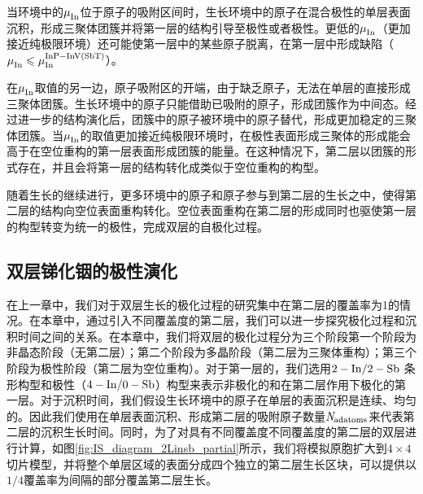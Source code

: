 当环境中的$\it \mu_{\rm In}^{\rm } \it$位于原子的吸附区间时，生长环境中的原子在混合极性的单层表面沉积，形成三聚体团簇并将第一层的结构引导至极性或者极性。更低的$\it \mu_{\rm In}^{\rm } \it$（更加接近纯极限环境）还可能使第一层中的某些原子脱离，在第一层中形成缺陷（$\it \mu_{\rm In}^{\rm } \it\leqslant \it \mu_{\rm In}^{\rm InP-InV\left(SbT\right)} \it$）。

在$\it \mu_{\rm In}^{\rm } \it$取值的另一边，原子吸附区的开端，由于缺乏原子，无法在单层的直接形成三聚体团簇。生长环境中的原子只能借助已吸附的原子，形成团簇作为中间态。经过进一步的结构演化后，团簇中的原子被环境中的原子替代，形成更加稳定的三聚体团簇。当$\it \mu_{\rm In}^{\rm } \it$的取值更加接近纯极限环境时，在极性表面形成三聚体的形成能会高于在空位重构的第一层表面形成团簇的能量。在这种情况下，第二层以团簇的形式存在，并且会将第一层的结构转化成类似于空位重构的构型。

随着生长的继续进行，更多环境中的原子和原子参与到第二层的生长之中，使得第二层的结构向空位表面重构转化。空位表面重构在第二层的形成同时也驱使第一层的构型转变为统一的极性，完成双层的自极化过程。



\subsection{双层锑化铟的极性演化}

在上一章中，我们对于双层生长的极化过程的研究集中在第二层的覆盖率为1的情况。在本章中，通过引入不同覆盖度的第二层，我们可以进一步探究极化过程和沉积时间之间的关系。在本章中，我们将双层的极化过程分为三个阶段\chinesecolon 第一个阶段为非晶态阶段（无第二层）；第二个阶段为多晶阶段（第二层为三聚体重构）；第三个阶段为极性阶段（第二层为空位重构）。对于第一层的，我们选用$\rm 2-In/2-Sb$ 条形构型和极性（$\rm 4-In/0-Sb$）构型来表示非极化的和在第二层作用下极化的第一层。对于沉积时间，我们假设生长环境中的原子在单层的表面沉积是连续、均匀的。因此我们使用在单层表面沉积、形成第二层的吸附原子数量$\it N_{\rm adatoms} \it$来代表第二层的沉积生长时间。同时，为了对具有不同覆盖度不同覆盖度的第二层的双层进行计算，如图\ref{fig:IS_diagram_2Linsb_partial}所示，我们将模拟原胞扩大到$4 \times 4$切片模型，并将整个单层区域的表面分成四个独立的第二层生长区块，可以提供以$1/ 4$覆盖率为间隔的部分覆盖第二层生长。

